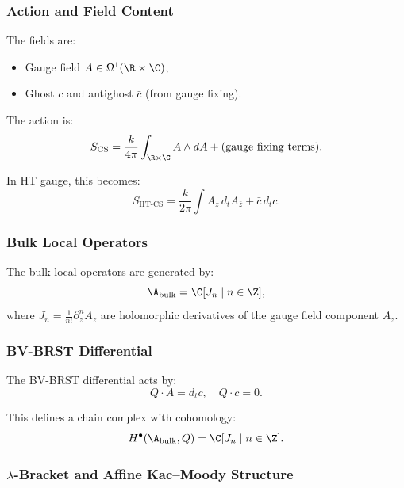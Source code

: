 \subsubsection{Action and Field Content}

The fields are:
\begin{itemize}
\item Gauge field $A \in \Omega^1(\R \times \C)$,
\item Ghost $c$ and antighost $\bar{c}$ (from gauge fixing).
\end{itemize}

The action is:
\begin{equation}
\label{eq:CS_action}
S_{\text{CS}} = \frac{k}{4\pi} \int_{\R \times \C} A \wedge dA + \text{(gauge fixing terms)}.
\end{equation}

In HT gauge, this becomes:
\begin{equation}
S_{\text{HT-CS}} = \frac{k}{2\pi} \int A_z \, d_t A_{\bar{z}} + \bar{c} \, d_t c.
\end{equation}

\subsubsection{Bulk Local Operators}

The bulk local operators are generated by:
\begin{equation}
\A_{\text{bulk}} = \C[J_n \mid n \in \Z],
\end{equation}
where $J_n = \frac{1}{n!} \partial_z^n A_z$ are holomorphic derivatives of the gauge field component $A_z$.

\subsubsection{BV-BRST Differential}

The BV-BRST differential acts by:
\begin{equation}
Q \cdot A = d_t c, \quad Q \cdot c = 0.
\end{equation}

This defines a chain complex with cohomology:
\begin{equation}
H^\bullet(\A_{\text{bulk}}, Q) = \C[J_n \mid n \in \Z].
\end{equation}

\subsubsection{$\lambda$-Bracket and Affine Kac--Moody Structure}

